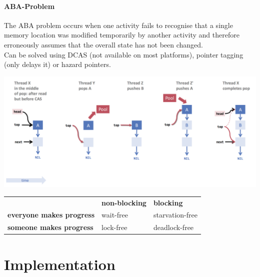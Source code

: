 \documentclass[11pt]{article}
\begin{document}
\paragraph{ABA-Problem}

The ABA problem occurs when one activity fails to recognise that a single memory location was modified temporarily by another activity and therefore erroneously assumes that the overall state has not been changed. \\

Can be solved using DCAS (not available on most platforms), pointer tagging (only delays it) or hazard pointers.

\begin{center}
	\includegraphics[width=400pt]{images/aba}
\end{center}

\begin{table}[H]
\centering
\begin{tabular}{lll}
                                 & \textbf{non-blocking} & \textbf{blocking} \\
\textbf{everyone makes progress} & wait-free             & starvation-free   \\
\textbf{someone makes progress}  & lock-free             & deadlock-free    
\end{tabular}
\end{table}

\section{Implementation}
\end{document}

